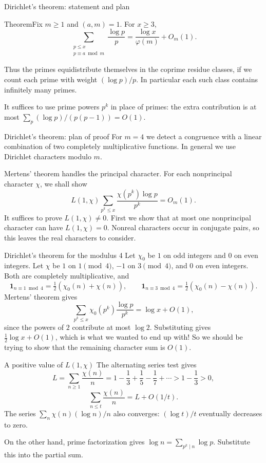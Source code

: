 \documentclass[aspectratio=169,11pt]{beamer}
\newcommand{\ind}{\mathbf1}
\begin{document}
\begin{frame}{Dirichlet's theorem: statement and plan}
\begin{block}{Theorem}Fix $m\ge1$ and $(a,m)=1$. For $x\ge3$,
\[\sum_{\substack{p\le x\\p\equiv a\bmod m}}\frac{\log p}{p}=\frac{\log x}{\varphi(m)}+O_m(1).\]\end{block}
Thus the primes equidistribute themselves in the coprime residue classes, if we count each prime with weight $(\log p)/p$. In particular each such class contains infinitely many primes.

It suffices to use prime powers $p^k$ in place of primes: the extra contribution is at most $\sum_p(\log p)/(p(p-1))=O(1)$.
\end{frame}
\begin{frame}{Dirichlet's theorem: plan of proof}
For $m=4$ we detect a congruence with a linear combination of two completely multiplicative functions. In general we use Dirichlet characters modulo $m$.

Mertens' theorem handles the principal character. For each nonprincipal character $\chi$, we shall show
\[L(1,\chi)\sum_{p^k\le x}\frac{\chi(p^k)\log p}{p^k}=O_m(1).\]
It suffices to prove $L(1,\chi)\ne0$. First we show that at most one nonprincipal character can have $L(1,\chi)=0$. Nonreal characters occur in conjugate pairs, so this leaves the real characters to consider.
\end{frame}
\begin{frame}{Dirichlet's theorem for the modulus 4}
Let $\chi_0$ be $1$ on odd integers and $0$ on even integers. Let $\chi$ be $1$ on $1\pmod4$, $-1$ on $3\pmod4$, and $0$ on even integers. Both are completely multiplicative, and
\[\ind_{n\equiv1\bmod4}=\tfrac12(\chi_0(n)+\chi(n)),\qquad
\ind_{n\equiv3\bmod4}=\tfrac12(\chi_0(n)-\chi(n)).\]
Mertens' theorem gives
\[\sum_{p^k\le x}\chi_0(p^k)\frac{\log p}{p^k}=\log x+O(1),\]
since the powers of $2$ contribute at most $\log2$. Substituting gives $\frac12\log x+O(1)$, which is what we wanted to end up with! So we should be trying to show that the remaining character sum is $O(1)$.
\end{frame}
\begin{frame}{A positive value of $L(1,\chi)$}
The alternating series test gives
\[L=\sum_{n\ge1}\frac{\chi(n)}n=1-\frac13+\frac15-\frac17+\cdots>1-\frac13>0,\]
\[\sum_{n\le t}\frac{\chi(n)}n=L+O(1/t).\]
The series $\sum_n\chi(n)(\log n)/n$ also converges: $(\log t)/t$ eventually decreases to zero.

On the other hand, prime factorization gives $\log n=\sum_{p^k\mid n}\log p$. Substitute this into the partial sum.
\end{frame}
\end{document}
